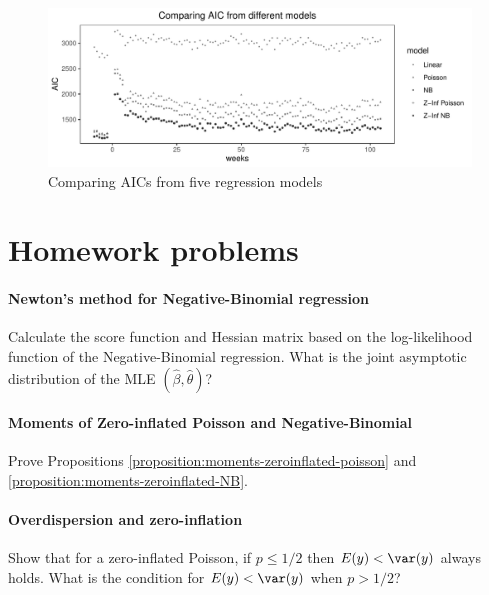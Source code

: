 \begin{figure}[ht]
\centering
\includegraphics[width = \textwidth]{figures/gym_comparing_aic.pdf}
\caption{Comparing AICs from five regression models}\label{fig::comparing-aic-gym}
\end{figure}





\section{Homework problems}

 

\paragraph{Newton's method for Negative-Binomial regression}\label{hw19::derivatives-nb-reg}

Calculate the score function and Hessian matrix based on the log-likelihood function of the Negative-Binomial regression.
What is the joint asymptotic distribution of the MLE $(\hat\beta, \hat\theta)$?





\paragraph{Moments of Zero-inflated Poisson and Negative-Binomial}\label{hw19::moment-0-poisson}

Prove Propositions \ref{proposition:moments-zeroinflated-poisson} and \ref{proposition:moments-zeroinflated-NB}. 


\paragraph{Overdispersion and zero-inflation}

Show that for a zero-inflated Poisson, if $p \leq 1/2$ then $E(y) < \var(y)$ always holds. What is the condition for $E(y) < \var(y)$ when $p>1/2$?




